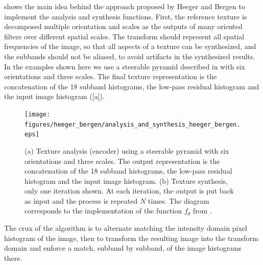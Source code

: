 {\Fig{\ref{fig:heegersubbands}} shows the main idea behind the approach proposed by Heeger and Bergen to implement the analysis and synthesis functions.  First, the reference texture is decomposed multiple orientation and scales as the outputs of many oriented filters over different spatial scales.  %
The transform should represent all spatial frequencies of the image, so that all aspects of a texture can be synthesized, and the subbands should not be aliased, to avoid artifacts in the synthesized results.
In the examples shown here we use a steerable pyramid \cite{Simoncelli95} described in \chap{\ref{chapter:image_pyramids}} with six orientations and three scales. The final texture representation is the concatenation of the 18 subband histograms, the low-pass residual histogram and the input image histogram (\fig{\ref{fig:heegersubbands}}[a]). 


\begin{figure}[t]
\centerline{
\texttt{[image: figures/heeger\_bergen/analysis\_and\_synthesis\_heeger\_bergen.eps]}
}
\caption{(a) Texture analysis (encoder) using a steerable pyramid with six orientations and three scales. The output representation is the concatenation of the 18 subband histograms, the low-pass residual histogram and the input image histogram. (b) Texture synthesis, only one iteration shown. At each iteration, the output is put back as input and the process is repeated $N$ times. The diagram corresponds to the implementation of the function $f_{\theta}$ from \fig{\ref{fig:heeger_bergen_iterations}}.
}
\label{fig:heegersubbands}
\end{figure}



 The crux of the algorithm is to alternate matching the intensity domain pixel histogram of the image, then to transform the resulting image into the transform domain and enforce a match, subband by subband, of the image histograms there. 

  
}
